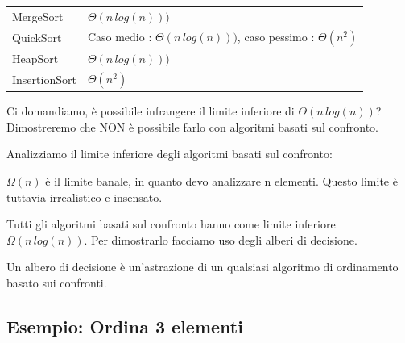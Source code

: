 \documentclass[tikz]{article}
\begin{document}
\begin{longtable}[]{@{}ll@{}}
\toprule
\begin{minipage}[t]{0.47\columnwidth}\raggedright\strut
{MergeSort}\strut
\end{minipage} & \begin{minipage}[t]{0.47\columnwidth}\raggedright\strut
$\Theta(n\,log(n)))$\strut
\end{minipage}\tabularnewline
\begin{minipage}[t]{0.47\columnwidth}\raggedright\strut
{QuickSort}\strut
\end{minipage} & \begin{minipage}[t]{0.47\columnwidth}\raggedright\strut
{Caso medio : $\Theta(n\,log(n)))$, caso pessimo : $\Theta(n^2)$}\strut
\end{minipage}\tabularnewline
\begin{minipage}[t]{0.47\columnwidth}\raggedright\strut
{HeapSort}\strut
\end{minipage} & \begin{minipage}[t]{0.47\columnwidth}\raggedright\strut
$\Theta(n\,log(n)))$\strut
\end{minipage}\tabularnewline
\begin{minipage}[t]{0.47\columnwidth}\raggedright\strut
{InsertionSort}\strut
\end{minipage} & \begin{minipage}[t]{0.47\columnwidth}\raggedright\strut
$\Theta(n^2)$\strut
\end{minipage}\tabularnewline
\bottomrule
\end{longtable}

{Ci domandiamo, è possibile infrangere il limite inferiore di $\Theta(n\,log(n))$? Dimostreremo che NON è possibile farlo con algoritmi basati sul confronto.}

{Analizziamo il limite inferiore degli algoritmi basati sul confronto:}

{$\Omega(n)$ è il limite banale, in quanto devo analizzare n elementi. Questo limite è tuttavia irrealistico e insensato.}

{Tutti gli algoritmi basati sul confronto hanno come limite inferiore $\Omega(n\,log(n))$. Per dimostrarlo facciamo uso degli alberi di decisione.}

{Un albero di decisione è un'astrazione di un qualsiasi algoritmo di ordinamento basato sui confronti.}

\subsection{Esempio: Ordina 3 elementi}
\end{document}

